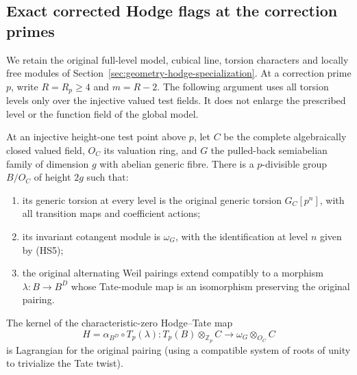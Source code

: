 \subsection{Exact corrected Hodge flags at the correction primes}
\label{sec:geometry-exact-corrected-flags}

We retain the original full-level model, cubical line, torsion
characters and locally free modules of Section~\ref{sec:geometry-hodge-specialization}.
At a correction prime \(p\), write \(R=R_p\ge4\) and \(m=R-2\).
The following argument uses all torsion levels only over the injective
valued test fields. It does not enlarge the prescribed level or the
function field of the global model.

\begin{lemma}
\label{lem:corrected-ht-test-tower}
At an injective height-one test point above \(p\), let \(C\) be the
complete algebraically closed valued field, \(O_C\) its valuation ring,
and \(G\) the pulled-back semiabelian family of dimension \(g\) with
abelian generic fibre. There is a \(p\)-divisible group \(B/O_C\) of
height \(2g\) such that:
\begin{enumerate}
\item its generic torsion at every level is the original generic
torsion \(G_C[p^n]\), with all transition maps and coefficient actions;
\item its invariant cotangent module is \(\omega_G\), with the
identification at level \(n\) given by (HS5);
\item the original alternating Weil pairings extend compatibly to
a morphism \(\lambda:B\to B^D\) whose Tate-module map is an
isomorphism preserving the original pairing.
\end{enumerate}
The kernel of the characteristic-zero Hodge--Tate map
\[
 H=\alpha_{B^D}\circ T_p(\lambda):
 T_p(B)\otimes_{\mathbb Z_p}C\longrightarrow\omega_G\otimes_{O_C} C
\]
is Lagrangian for the original pairing (using a compatible system of
roots of unity to trivialize the Tate twist).
\end{lemma}

